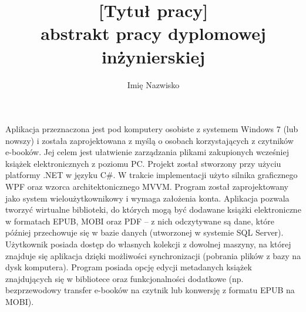 \documentclass[a4paper]{article}
\title{\textbf{[Tytuł pracy]}\\ \large abstrakt pracy dyplomowej inżynierskiej}
\author{Imię Nazwisko}
\begin{document}
\maketitle
\thispagestyle{empty}

Aplikacja przeznaczona jest pod komputery osobiste z systemem Windows 7 (lub nowszy) i została zaprojektowana z myślą o osobach korzystających z czytników e-booków. Jej celem jest ułatwienie zarządzania plikami zakupionych wcześniej książek elektronicznych z poziomu PC. Projekt został stworzony przy użyciu platformy .NET w języku C\#. W trakcie implementacji użyto silnika graficznego WPF oraz wzorca architektonicznego MVVM. Program został zaprojektowany jako system wieloużytkownikowy i wymaga założenia konta. Aplikacja pozwala tworzyć wirtualne biblioteki, do których mogą być dodawane książki elektroniczne w formatach EPUB, MOBI oraz PDF -- z nich odczytywane są dane, które później przechowuje się w bazie danych (utworzonej w systemie SQL Server). Użytkownik posiada dostęp do własnych kolekcji z dowolnej maszyny, na której znajduje się aplikacja dzięki możliwości synchronizacji (pobrania plików z bazy na dysk komputera). Program posiada opcję edycji metadanych książek znajdujących się w bibliotece oraz funkcjonalności dodatkowe (np. bezprzewodowy transfer e-booków na czytnik lub konwersję z formatu EPUB na MOBI).
\end{document}
